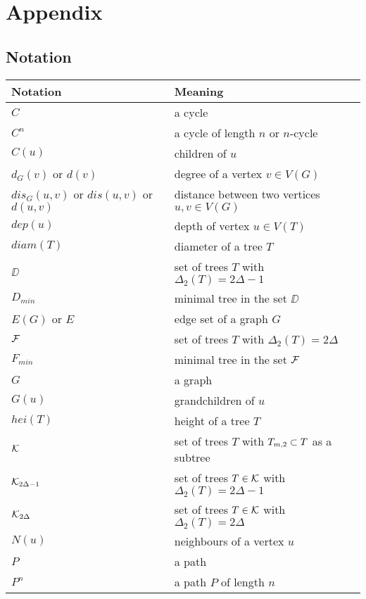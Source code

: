 \chapter*{Appendix} 
\section*{Notation}
\begin{center}
    \begin{longtable}{ | l |  p{8cm} |}
    \hline
    Notation & Meaning \\ \hline \hline
$C$ & a cycle \\ \hline
$C^n$ & a cycle of length $n$ or $n$-cycle \\ \hline
$C(u)$ & children of $u$ \\ \hline
$d_G(v)$ or $d(v)$ & degree of a vertex $v \in V(G)$  \\ \hline
$dis_G(u,v)$ or $dis(u,v)$ or $d(u,v)$ & distance between two vertices $u,v \in V(G)$  \\ \hline
$dep(u)$ & depth of vertex $u \in V(T)$ \\ \hline 
$diam(T)$ & diameter of a tree $T$ \\ \hline
$\DD$ & set of trees $T$ with $\Delta_2(T) = 2\Delta-1$ \\ \hline
$D_{min}$ & minimal tree in the set $\DD$ \\ \hline
$E(G)$ or $E$ & edge set of a graph $G$ \\ \hline
${\cal F}$ & set of trees $T$ with $\Delta_2(T) = 2\Delta$ \\ \hline
$F_{min}$ & minimal tree in the set ${\cal F}$ \\ \hline 
$G$ & a graph \\ \hline
$G(u)$ & grandchildren of $u$ \\ \hline
$hei(T)$ & height of a tree $T$ \\ \hline
${\cal K}$ & set of trees $T$ with $\tm2 \subset T$ as a subtree \\ \hline
${\cal K}_{2\Delta-1}$ & set of trees $T \in {\cal K}$ with $\Delta_2(T) = 2\Delta-1$ \\ \hline
${\cal K}_{2\Delta}$ & set of trees $T \in {\cal K}$ with $\Delta_2(T) = 2\Delta$ \\ \hline
$N(u)$ & neighbours of a vertex $u$ \\ \hline
$P$ & a path \\ \hline
$P^n$ & a path $P$ of length $n$ \\ \hline

\end{longtable}
\end{center}
